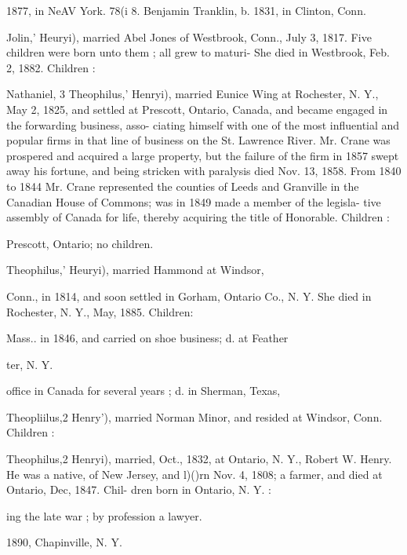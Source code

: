 \documentclass{book}
\begin{document}
1877, in NeAV York. 
78(i 8. Benjamin Tranklin, b. 1831, in Clinton, Conn. 

Jolin,' Heuryi), married Abel Jones of Westbrook, Conn., July 
3, 1817. Five children were born unto them ; all grew to maturi- 
She died in Westbrook, Feb. 2, 1882. Children : 






Nathaniel, 3 Theophilus,' Henryi), married Eunice Wing at 
Rochester, N. Y., May 2, 1825, and settled at Prescott, Ontario, 
Canada, and became engaged in the forwarding business, asso- 
ciating himself with one of the most influential and popular firms 
in that line of business on the St. Lawrence River. Mr. Crane 
was prospered and acquired a large property, but the failure of 
the firm in 1857 swept away his fortune, and being stricken with 
paralysis died Nov. 13, 1858. From 1840 to 1844 Mr. Crane 
represented the counties of Leeds and Granville in the Canadian 
House of Commons; was in 1849 made a member of the legisla- 
tive assembly of Canada for life, thereby acquiring the title of 
Honorable. Children : 




Prescott, Ontario; no children. 









Theophilus,' Heuryi), married Hammond at Windsor, 

Conn., in 1814, and soon settled in Gorham, Ontario Co., N. Y. 
She died in Rochester, N. Y., May, 1885. Children: 


Mass.. in 1846, and carried on shoe business; d. at Feather 


ter, N. Y. 


office in Canada for several years ; d. in Sherman, Texas, 




Theopliilus,2 Henry'), married Norman Minor, and resided at 
Windsor, Conn. Children : 




Theophilus,2 Henryi), married, Oct., 1832, at Ontario, N. Y., 
Robert W. Henry. He was a native, of New Jersey, and l)()rn 
Nov. 4, 1808; a farmer, and died at Ontario, Dec, 1847. Chil- 
dren born in Ontario, N. Y. : 


ing the late war ; by profession a lawyer. 



1890, Chapinville, N. Y. 
\end{document}
